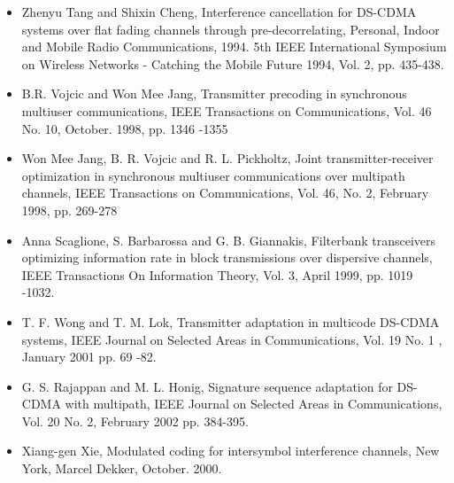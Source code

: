 \documentclass[20pt,landscape]{foils}
\begin{document}
\begin{itemize}\tiny
\item Zhenyu Tang and Shixin Cheng, Interference cancellation for
DS-CDMA systems over flat fading channels through
pre-decorrelating, Personal, Indoor and Mobile Radio
Communications, 1994. 5th IEEE International Symposium on Wireless
Networks - Catching the Mobile Future 1994, Vol. 2, pp. 435-438.


\item B.R. Vojcic and Won Mee Jang, Transmitter precoding in
synchronous multiuser communications, IEEE Transactions on
Communications, Vol. 46 No. 10, October. 1998, pp. 1346 -1355

\item Won Mee Jang, B. R. Vojcic and R. L. Pickholtz, Joint
transmitter-receiver optimization in synchronous multiuser
communications over multipath channels, IEEE Transactions on
Communications, Vol. 46, No. 2, February 1998, pp. 269-278

\item Anna Scaglione, S. Barbarossa and G. B. Giannakis,
Filterbank transceivers optimizing information rate in block
transmissions over dispersive channels, IEEE Transactions On
Information Theory, Vol. 3, April 1999, pp. 1019 -1032.

\item T. F. Wong and T. M. Lok, Transmitter adaptation in
multicode DS-CDMA systems, IEEE Journal on Selected Areas in
Communications, Vol. 19 No. 1 , January 2001 pp. 69 -82.

\item G. S. Rajappan and M. L. Honig, Signature sequence
adaptation for DS-CDMA with multipath, IEEE Journal on Selected
Areas in Communications, Vol. 20 No. 2, February 2002 pp. 384-395.

\item Xiang-gen Xie, Modulated coding for intersymbol interference
channels, New York, Marcel Dekker, October. 2000.

\end{itemize}
\end{document}
